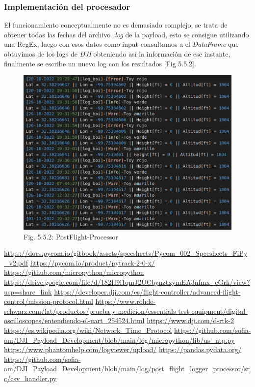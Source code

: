 \documentclass[12pt]{article}
\begin{document}
\subsubsection{Implementación del procesador}
El funcionamiento conceptualmente no es demasiado complejo, se trata de obtener todas las fechas del archivo \textit{.log} de la payload, esto se consigue utilizando una RegEx, luego con esos datos como input consultamos a el \textit{DataFrame} que obtuvimos de los logs de \textit{DJI} obteniendo así la información de ese instante, finalmente se escribe un nuevo log con los resultados [Fig 5.5.2].

\begin{figure}[ht]
  \centering
    \includegraphics[scale=0.5]{images/post-flight-processor.png}
    \caption{Fig. 5.5.2: PostFlight-Processor}
\end{figure}

\clearpage
{}
\begin{thebibliography}{9}
 \url{https://docs.pycom.io/gitbook/assets/specsheets/Pycom_002_Specsheets_FiPy_v2.pdf}
 \url{https://pycom.io/product/pytrack-2-0-x/} 
 \url{https://github.com/micropython/micropython}
 \url{https://drive.google.com/file/d/182H9i1qmJ2UCbynztxymEA3nfmx_eGrk/view?usp=share_link}
 \url{https://developer.dji.com/es/flight-controller/advanced-flight-control/mission-protocol.html}
 \url{https://www.rohde-schwarz.com/lat/productos/prueba-y-medicion/essentials-test-equipment/digital-oscilloscopes/entendiendo-el-uart_254524.html} 
 \url{https://www.dji.com/d-rtk-2}
 \url{https://es.wikipedia.org/wiki/Network_Time_Protocol}
 \url{https://github.com/sofia-am/DJI_Payload_Development/blob/main/log/micropython/lib/us_ntp.py}
 \url{https://www.phantomhelp.com/logviewer/upload/}
 \url{https://pandas.pydata.org/}
 \url{https://github.com/sofia-am/DJI\_Payload\_Development/blob/main/log/post\_flight\_logger\_processor/src/csv\_handler.py}

\end{thebibliography}
\end{document}

